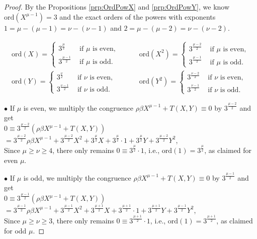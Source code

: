 \documentclass{amsart}
\theoremstyle{definition}
\numberwithin{equation}{section}
\begin{document}
\begin{proof}
By the Propositions
\ref{prp:OrdPowX}
and
\ref{prp:OrdPowY},
we know \(\mathrm{ord}(X^{\mu-1})=3\) and the exact orders of the powers with exponents
\(1=\mu-(\mu-1)=\nu-(\nu-1)\) and \(2=\mu-(\mu-2)=\nu-(\nu-2)\).

\begin{equation}
\label{eqn:OrdSmallPow}
\begin{aligned}
\mathrm{ord}(X)=
\begin{cases}
3^{\frac{\mu}{2}}   & \text{ if } \mu \text{ is even},\\
3^{\frac{\mu-1}{2}} & \text{ if } \mu \text{ is odd}.
\end{cases}
\quad & \quad
\mathrm{ord}(X^{2})=
\begin{cases}
3^{\frac{\mu-2}{2}} & \text{ if } \mu \text{ is even},\\
3^{\frac{\mu-1}{2}} & \text{ if } \mu \text{ is odd}.
\end{cases}
\\
\mathrm{ord}(Y)=
\begin{cases}
3^{\frac{\nu}{2}}   & \text{ if } \nu \text{ is even},\\
3^{\frac{\nu-1}{2}} & \text{ if } \nu \text{ is odd}.
\end{cases}
\quad & \quad
\mathrm{ord}(Y^{2})=
\begin{cases}
3^{\frac{\nu-2}{2}} & \text{ if } \nu \text{ is even},\\
3^{\frac{\nu-1}{2}} & \text{ if } \nu \text{ is odd}.
\end{cases}
\end{aligned}
\end{equation}

\(\bullet\)
If \(\mu\) is even, we multiply the congruence \(\rho\beta X^{\mu-1}+T(X,Y)\equiv 0\) by \(3^{\frac{\mu-2}{2}}\) and get\\
\(0\equiv 3^{\frac{\mu-2}{2}}\left(\rho\beta X^{\mu-1}+T(X,Y)\right)\)\\
\(=3^{\frac{\mu-2}{2}}\rho\beta X^{\mu-1}+3^{\frac{\mu-2}{2}}X^2+3^{\frac{\mu}{2}}X
+3^{\frac{\mu}{2}}\cdot 1+3^{\frac{\mu}{2}}Y+3^{\frac{\mu-2}{2}}Y^2\),\\
Since \(\mu\ge\nu\ge 4\), there only remains \(0\equiv 3^{\frac{\mu}{2}}\cdot 1\), i.e.,
\(\mathrm{ord}(1)=3^{\frac{\mu}{2}}\), as claimed for even \(\mu\).

\(\bullet\)
If \(\mu\) is odd, we multiply the congruence \(\rho\beta X^{\mu-1}+T(X,Y)\equiv 0\) by \(3^{\frac{\mu-1}{2}}\) and get\\
\(0\equiv 3^{\frac{\mu-1}{2}}\left(\rho\beta X^{\mu-1}+T(X,Y)\right)\)\\
\(=3^{\frac{\mu-1}{2}}\rho\beta X^{\mu-1}+3^{\frac{\mu-1}{2}}X^2+3^{\frac{\mu+1}{2}}X
+3^{\frac{\mu+1}{2}}\cdot 1+3^{\frac{\mu+1}{2}}Y+3^{\frac{\mu-1}{2}}Y^2\),\\
Since \(\mu\ge\nu\ge 3\), there only remains \(0\equiv 3^{\frac{\mu+1}{2}}\cdot 1\), i.e.,
\(\mathrm{ord}(1)=3^{\frac{\mu+1}{2}}\), as claimed for odd \(\mu\).
\end{proof}
\end{document}
